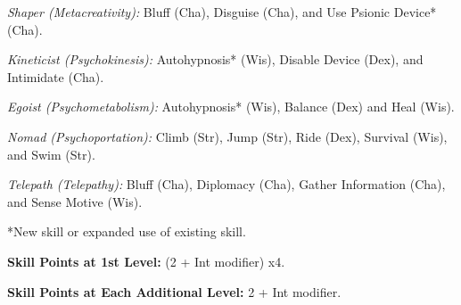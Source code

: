 \documentclass{article}
\begin{document}
\textit{Shaper (Metacreativity): }Bluff (Cha), Disguise (Cha), and Use Psionic 
Device* (Cha).

\textit{Kineticist (Psychokinesis): }Autohypnosis* (Wis), Disable Device (Dex), 
and Intimidate (Cha).

\textit{Egoist (Psychometabolism): }Autohypnosis* (Wis), Balance (Dex) and Heal 
(Wis).

\textit{Nomad (Psychoportation): }Climb (Str), Jump (Str), Ride (Dex), Survival 
(Wis), and Swim (Str).

\textit{Telepath (Telepathy): }Bluff (Cha), Diplomacy (Cha), Gather Information 
(Cha), and Sense Motive (Wis).

*New skill or expanded use of existing skill.

\textbf{Skill Points at 1st Level:} (2 + Int modifier) x4.

\textbf{Skill Points at Each Additional Level:} 2 + Int modifier.
\end{document}
